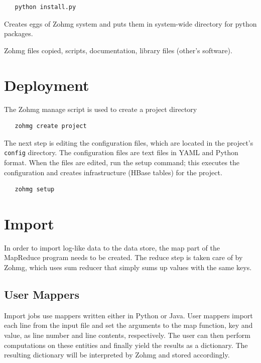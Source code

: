 \begin{verbatim}
   python install.py
\end{verbatim}

Creates eggs of Zohmg system and puts them in system-wide directory for python
packages.

Zohmg files copied, scripts, documentation, library files (other's software).


\section*{Deployment}

The Zohmg manage script is used to create a project directory

\begin{verbatim}
   zohmg create project
\end{verbatim}

\noindent The next step is editing the configuration files, which are located in
the project's \texttt{config} directory. The configuration files are text files
in YAML and Python format. When the files are edited, run the setup command;
this executes the configuration and creates infrastructure (HBase tables) for
the project.

\begin{verbatim}
   zohmg setup
\end{verbatim}


\section*{Import}

In order to import log-like data to the data store, the map part of the
MapReduce program needs to be created. The reduce step is taken care of by
Zohmg, which uses sum reducer that simply sums up values with the same keys.


\subsection*{User Mappers}

Import jobs use mappers written either in Python or Java. User mappers import
each line from the input file and set the arguments to the map function, key and
value, as line number and line contents, respectively. The user can then perform
computations on these entities and finally yield the results as a dictionary.
The resulting dictionary will be interpreted by Zohmg and stored accordingly.

